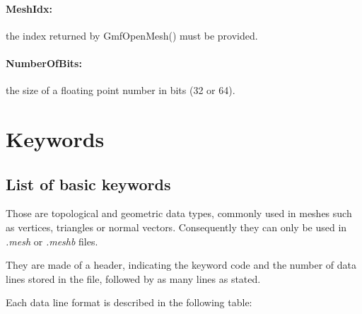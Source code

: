 \documentclass[a4paper,12pt]{article}
\begin{document}
\paragraph{MeshIdx:}
the index returned by GmfOpenMesh() must be provided.

\paragraph{NumberOfBits:}
the size of a floating point number in bits (32 or 64).



%
%

\newpage
\section{Keywords}
\label{keywords}

\subsection{List of basic keywords}

Those are topological and geometric data types, commonly used in meshes such as vertices, triangles or normal vectors. Consequently they can only be used in \emph{.mesh} or \emph{.meshb} files.

They are made of a header, indicating the keyword code and the number of data lines stored in the file, followed by as many lines as stated.

Each data line format is described in the following table:
\end{document}

